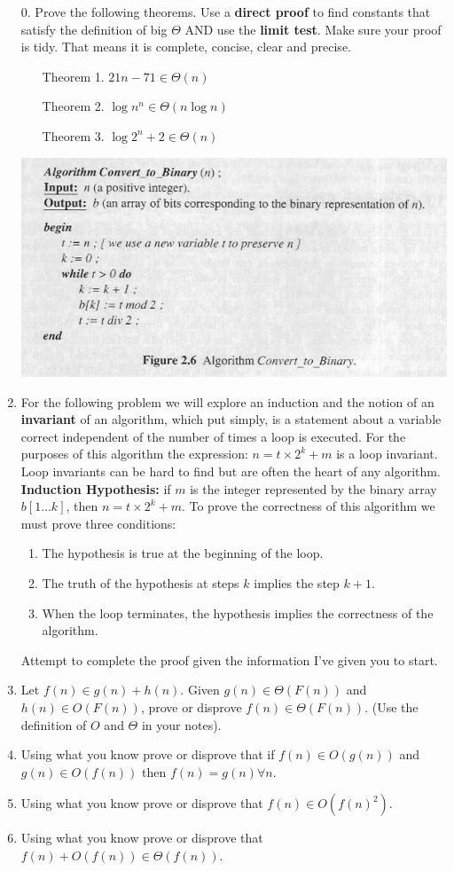 \documentclass[12pt]{article}
\begin{document}
\begin{enumerate}
\item[0. ] Prove the following theorems. Use a \textbf{direct proof} to find constants 
that satisfy the definition of big $\Theta$ AND use the \textbf{limit test}. Make sure your 
proof is tidy. That means it is complete, concise, clear and precise.
\begin{enumerate}
\item[Theorem 1.] $21n - 71 \in \Theta(n)$
\item[Theorem 2.] $\log{n^n} \in \Theta(n\log{n})$
\item[Theorem 3.] $\log{2^n+2} \in \Theta(n)$
\end{enumerate}
\newpage
\centerline{\includegraphics[scale = 0.6]{algo.jpg}}
\item For the following problem we will explore an induction and the
notion of an \textbf{invariant} of an algorithm, which put simply, is a statement about
a variable correct independent of the number of times a loop is executed. For the purposes of 
this algorithm the expression: $n = t \times 2^k + m$ is a loop invariant. Loop invariants can 
be hard to find but are often the heart of any algorithm.\\
\textbf{Induction Hypothesis: } if $m$ is the integer represented by 
the binary array $b[1\dots k]$, then $n = t \times 2^k + m$. To prove the 
correctness of this algorithm we must prove three conditions:
\begin{enumerate}
\item The hypothesis is true at the beginning of the loop.
\item The truth of the hypothesis at steps $k$ implies the step $k+1$.
\item When the loop terminates, the hypothesis implies the correctness of the algorithm.
\end{enumerate}
Attempt to complete the proof given the information I've given you to start.
\newpage
\item Let $f(n) \in g(n) + h(n)$. Given $g(n) \in \Theta (F(n))$ and $h(n) \in O(F(n))$, prove or 
disprove $f(n) \in \Theta(F(n))$. (Use the definition of $O$ and $\Theta$ in your notes).
\newpage
\item Using what you know prove or disprove that  if $f(n) \in O(g(n)) $ and $g(n) \in O(f(n))$ then $f(n) = g(n) \forall n$.
\newpage
\item Using what you know prove or disprove that $f(n)\in O(f(n)^2)$.
\newpage
\item Using what you know prove or disprove that $f(n) + O(f(n)) \in \Theta(f(n))$.
\end{enumerate}
\end{document}
